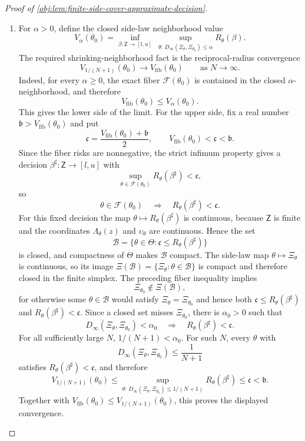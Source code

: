 \documentclass[11pt]{article}
\begin{document}
\begin{proof}[Proof of \cref{obj:lem:finite-side-cover-approximate-decision}]
\begin{enumerate}
\item For \(\alpha>0\), define the closed side-law neighborhood value
\[
V_\alpha(\theta_0)
=
\inf_{\beta:\mathsf Z\to[l,u]}\ 
\sup_{\theta:\,D_\infty(\Xi_\theta,\Xi_{\theta_0})\le \alpha} R_\theta(\beta).
\]
The required shrinking-neighborhood fact is the reciprocal-radius convergence
\[
V_{1/(N+1)}(\theta_0)\longrightarrow V_{\mathrm{fib}}(\theta_0)
\qquad\text{as }N\to\infty .
\]
Indeed, for every \(\alpha\ge0\), the exact fiber \(\mathcal F(\theta_0)\) is contained in the closed \(\alpha\)-neighborhood, and therefore
\[
V_{\mathrm{fib}}(\theta_0)\le V_\alpha(\theta_0).
\]
This gives the lower side of the limit. For the upper side, fix a real number \(\mathfrak b>V_{\mathrm{fib}}(\theta_0)\) and put
\[
\mathfrak c=\frac{V_{\mathrm{fib}}(\theta_0)+\mathfrak b}{2},
\qquad
V_{\mathrm{fib}}(\theta_0)<\mathfrak c<\mathfrak b.
\]
Since the fiber risks are nonnegative, the strict infimum property gives a decision \(\beta^\sharp:\mathsf Z\to[l,u]\) with
\[
\sup_{\theta\in\mathcal F(\theta_0)}R_\theta(\beta^\sharp)<\mathfrak c,
\]
so
\[
\theta\in\mathcal F(\theta_0)
\quad\Longrightarrow\quad
R_\theta(\beta^\sharp)<\mathfrak c.
\]
For this fixed decision the map \(\theta\mapsto R_\theta(\beta^\sharp)\) is continuous, because \(\mathsf Z\) is finite and the coordinates \(\Lambda_\theta(z)\) and \(\upsilon_\theta\) are continuous. Hence the set
\[
\mathcal B=
\{\theta\in\Theta:\mathfrak c\le R_\theta(\beta^\sharp)\}
\]
is closed, and compactness of \(\Theta\) makes \(\mathcal B\) compact. The side-law map \(\theta\mapsto\Xi_\theta\) is continuous, so its image \(\Xi(\mathcal B)=\{\Xi_\theta:\theta\in\mathcal B\}\) is compact and therefore closed in the finite simplex. The preceding fiber inequality implies
\[
\Xi_{\theta_0}\notin \Xi(\mathcal B),
\]
for otherwise some \(\theta\in\mathcal B\) would satisfy \(\Xi_\theta=\Xi_{\theta_0}\) and hence both \(\mathfrak c\le R_\theta(\beta^\sharp)\) and \(R_\theta(\beta^\sharp)<\mathfrak c\). Since a closed set misses \(\Xi_{\theta_0}\), there is \(\alpha_0>0\) such that
\[
D_\infty(\Xi_\theta,\Xi_{\theta_0})<\alpha_0
\quad\Longrightarrow\quad
R_\theta(\beta^\sharp)<\mathfrak c .
\]
For all sufficiently large \(N\), \(1/(N+1)<\alpha_0\). For such \(N\), every \(\theta\) with
\[
D_\infty(\Xi_\theta,\Xi_{\theta_0})\le \frac1{N+1}
\]
satisfies \(R_\theta(\beta^\sharp)<\mathfrak c\), and therefore
\[
V_{1/(N+1)}(\theta_0)
\le
\sup_{\theta:\,D_\infty(\Xi_\theta,\Xi_{\theta_0})\le 1/(N+1)}
R_\theta(\beta^\sharp)
\le \mathfrak c
<\mathfrak b.
\]
Together with \(V_{\mathrm{fib}}(\theta_0)\le V_{1/(N+1)}(\theta_0)\), this proves the displayed convergence.


\end{enumerate}
\end{proof}
\end{document}
